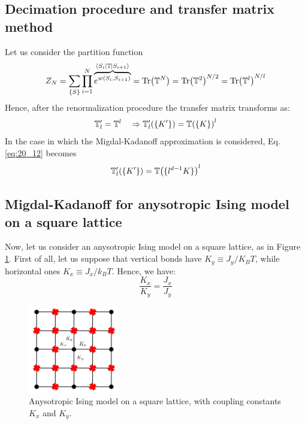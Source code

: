 \documentclass[../main/main.tex]{subfiles}
\begin{document}
\subsection{Decimation procedure and transfer matrix method}
Let us consider the partition function
\begin{equation*}
  Z_N = \sum_{\{ S \}  }^{} \prod_{i=1}^{N} \overbrace{e^{w (S_i,S_{i+1})} }^{\bra{S_i} \mathbb{T} \ket{S_{i+1}}  }
  = \Tr(\mathbb{T}^N) =   \Tr(\mathbb{T}^2)^{N/2} = \Tr(\mathbb{T}^l)^{N/l}
\end{equation*}
Hence, after the renormalization procedure the transfer matrix transforms as:
\begin{equation}
  \mathbb{T}_l' = \mathbb{T}^l \quad \Rightarrow   \mathbb{T}_l' \qty( \{ K' \}  )  =   \mathbb{T} \qty(\{ K \}  )^l
  \label{eq:20_12}
\end{equation}
In the case in which the Migdal-Kadanoff approximation is considered, Eq.\eqref{eq:20_12} becomes
\begin{equation}
   \mathbb{T}_l' \qty( \{ K' \}  )  =   \mathbb{T} \qty(\{ l^{d-1} K \}  )^l
\end{equation}



\clearpage

\subsection{Migdal-Kadanoff for anysotropic Ising model on a square lattice}

Now, let us consider an anysotropic Ising model on a square lattice, as in Figure \ref{fig:20_11}. First of all, let us suppose that vertical bonds have \( K_y \equiv J_y/K_B T \), while horizontal ones \( K_x \equiv J_x/k_B T \). Hence, we have:
\begin{equation*}
  \frac{K_x}{K_y} = \frac{J_x}{J_y}
\end{equation*}

\begin{figure}[h!]
\centering
\includegraphics[width=0.35\textwidth]{../lessons/20_image/13.pdf}
\caption{\label{fig:20_11} Anysotropic Ising model on a square lattice, with coupling constants \( K_x \) and \( K_y \).}
\end{figure}
\end{document}
